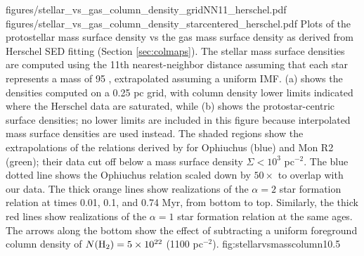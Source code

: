 \documentclass[twocolumn]{aastex61}
\begin{document}
\FigureTwo
{figures/stellar_vs_gas_column_density_gridNN11_herschel.pdf}
{figures/stellar_vs_gas_column_density_starcentered_herschel.pdf}
{Plots of the protostellar mass surface density vs the gas mass surface density
as derived from Herschel SED fitting (Section \ref{sec:colmaps}).  The stellar
mass surface densities are computed using the 11th
nearest-neighbor distance assuming that each star represents
a mass of 95 \msun, extrapolated assuming a uniform IMF.  (a) shows the
densities computed on a 0.25 pc grid, with column density lower limits
indicated where the Herschel data are saturated,
while (b) shows
the protostar-centric surface densities; no lower limits are included in this
figure because interpolated mass surface densities are used instead.  The
shaded regions
show the extrapolations of the relations derived by \citet{Gutermuth2011a}
for Ophiuchus (blue) and Mon R2 (green); their data cut off below a mass
surface density $\Sigma < 10^3$ \msun pc$^{-2}$. 
The blue dotted line shows the Ophiuchus relation scaled down by
$50\times$ to overlap with our data.
The thick orange lines show realizations of the \citet{Gutermuth2011a} $\alpha=2$ star
formation relation at times 0.01, 0.1, and 0.74 Myr, from bottom to top.
Similarly, the thick red lines show realizations of the $\alpha=1$ star
formation relation at the same ages.
The arrows along
the bottom show the effect of subtracting a uniform foreground column
density of $N(\textrm{H}_{2})=5\times10^{22}$ \persc (1100 \msun pc$^{-2}$).
}
{fig:stellarvsmasscolumn}{1}{0.5\textwidth}
\end{document}
